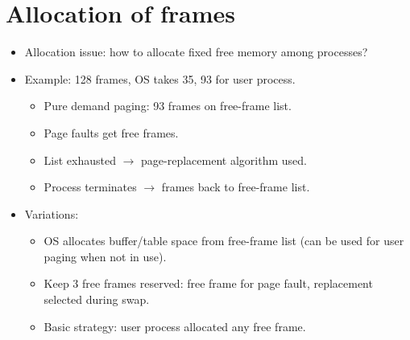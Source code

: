 \section{Allocation of frames}
\begin{itemize}
    \item Allocation issue: how to allocate fixed free memory among processes?
    \item Example: 128 frames, OS takes 35, 93 for user process.
    \begin{itemize}
        \item Pure demand paging: 93 frames on free-frame list.
        \item Page faults get free frames.
        \item List exhausted $\rightarrow$ page-replacement algorithm used.
        \item Process terminates $\rightarrow$ frames back to free-frame list.
    \end{itemize}
    \item Variations:
    \begin{itemize}
        \item OS allocates buffer/table space from free-frame list (can be used for user paging when not in use).
        \item Keep 3 free frames reserved: free frame for page fault, replacement selected during swap.
        \item Basic strategy: user process allocated any free frame.
    \end{itemize}
\end{itemize}

